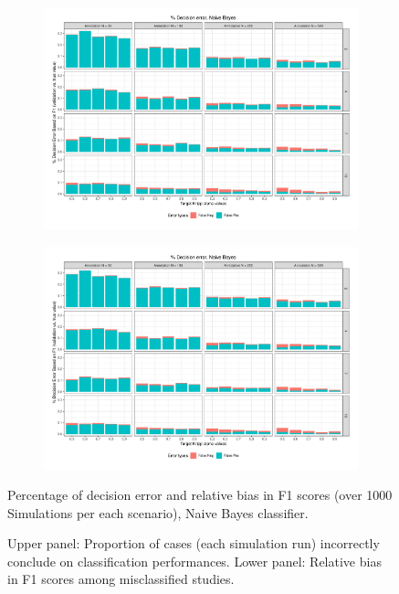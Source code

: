 \documentclass[man, 12pt, a4paper, nolmodern, noextraspace]{apa6}
\begin{document}
\begin{figure}
    \centering
    \begin{subfigure}[t]{0.95\textwidth}
        \centering
        \includegraphics[clip, width=\linewidth, page = 1]{Results/BAYES_summary_05.pdf} 
    \end{subfigure}
    \begin{subfigure}[t]{0.95\textwidth}
        \centering
        \captionsetup{font=small}
        \includegraphics[clip, width=\linewidth, page = 2]{Results/BAYES_summary_05.pdf} 
    \end{subfigure}
    
    \captionsetup{format=hang}
    \caption{Percentage of decision error and relative bias in F1 scores (over 1000 Simulations per each scenario), Naive Bayes classifier.} 
    \label{fig:Figure2}
    \captionsetup{font=small}
    \caption*{Upper panel: Proportion of cases (each simulation run) incorrectly conclude on classification performances. Lower panel: Relative bias in F1 scores among misclassified studies.}
\end{figure}          
\end{document}
